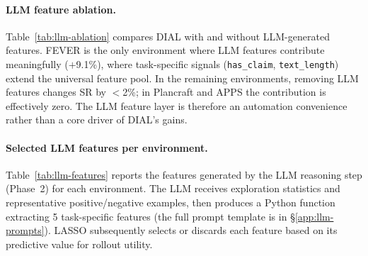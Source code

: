 \paragraph{LLM feature ablation.}
\begin{table}
\vspace{-12pt}
\caption{LLM feature ablation. SR (\%) with and without
LLM-generated features.}
\label{tab:llm-ablation}
\centering
{}
\vspace{-10pt}
\end{table}
Table~\ref{tab:llm-ablation} compares DIAL with and without
LLM-generated features. FEVER is the only environment where
LLM features contribute meaningfully ($+$9.1\%), where
task-specific signals (\texttt{has\_claim}, \texttt{text\_length})
extend the universal feature pool. In the remaining environments,
removing LLM features changes SR by ${<}$2\%; in Plancraft and
APPS the contribution is effectively zero. The LLM feature
layer is therefore an automation convenience rather than a
core driver of DIAL's gains.

\paragraph{Selected LLM features per environment.}
Table~\ref{tab:llm-features} reports the features generated by the
LLM reasoning step (Phase~2) for each environment. The LLM receives
exploration statistics and representative positive/negative examples,
then produces a Python function extracting 5 task-specific features
(the full prompt template is in \S\ref{app:llm-prompts}). LASSO
subsequently selects or discards each feature based on its predictive
value for rollout utility.

